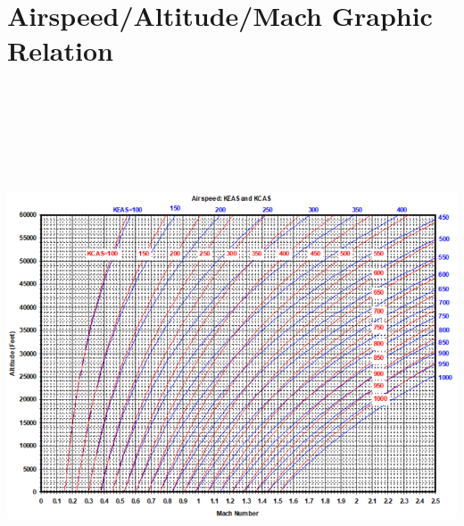 \documentclass[
]{book}
\begin{document}
\hypertarget{airspeedaltitudemach-graphic-relation}{%
\section{Airspeed/Altitude/Mach Graphic Relation}\label{airspeedaltitudemach-graphic-relation}}

\includegraphics[width=8.68611in,height=6.31181in]{media/04/image53.png}
\end{document}
